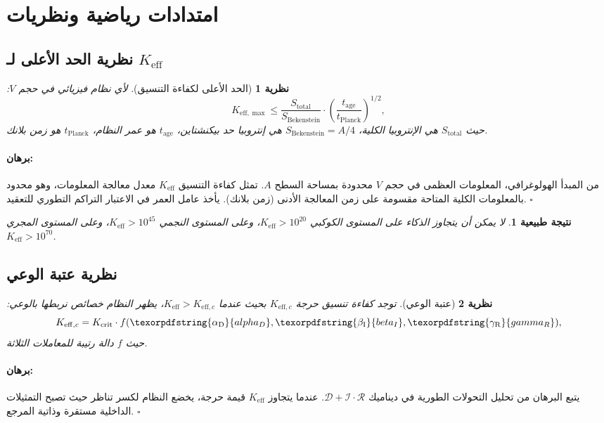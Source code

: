\documentclass[12pt,a4paper]{article}
\newtheorem{theorem}{نظرية}
\newtheorem{corollary}{نتيجة طبيعية}
\renewenvironment{proof}{\paragraph{برهان:}}{\hfill$\square$}
\DeclareRobustCommand{\alD}{\texorpdfstring{\ensuremath{\alpha_{\mathrm{D}}}}{alpha_D}}
\DeclareRobustCommand{\beI}{\texorpdfstring{\ensuremath{\beta_{\mathrm{I}}}}{beta_I}}
\DeclareRobustCommand{\gaR}{\texorpdfstring{\ensuremath{\gamma_{\mathrm{R}}}}{gamma_R}}
\newcommand{\eff}{\mathrm{eff}}
\newcommand{\Ke}{K_{\eff}}
\newcommand{\Kemax}{K_{\eff,\max}}
\newcommand{\Kec}{K_{\eff,c}}
\newcommand{\Kcrit}{K_{\mathrm{crit}}}
\begin{document}
	\section{امتدادات رياضية ونظريات}
	
	\subsection{نظرية الحد الأعلى لـ \(\Ke\)}
	
	\begin{theorem}[الحد الأعلى لكفاءة التنسيق]
		لأي نظام فيزيائي في حجم \(V\):
		\[
		\Kemax \leq \frac{S_{\mathrm{total}}}{S_{\mathrm{Bekenstein}}} \cdot \left(\frac{t_{\mathrm{age}}}{t_{\mathrm{Planck}}}\right)^{1/2},
		\]
		حيث \(S_{\mathrm{total}}\) هي الإنتروبيا الكلية، \(S_{\mathrm{Bekenstein}} = A/4\) هي إنتروبيا حد بيكنشتاين، \(t_{\mathrm{age}}\) هو عمر النظام، \(t_{\mathrm{Planck}}\) هو زمن بلانك.
	\end{theorem}
	
	\begin{proof}
		من المبدأ الهولوغرافي، المعلومات العظمى في حجم \(V\) محدودة بمساحة السطح \(A\). تمثل كفاءة التنسيق \(\Ke\) معدل معالجة المعلومات، وهو محدود بالمعلومات الكلية المتاحة مقسومة على زمن المعالجة الأدنى (زمن بلانك). يأخذ عامل العمر في الاعتبار التراكم التطوري للتعقيد.
	\end{proof}
	
	\begin{corollary}
		لا يمكن أن يتجاوز الذكاء على المستوى الكوكبي \(\Ke > 10^{20}\)، وعلى المستوى النجمي \(\Ke > 10^{45}\)، وعلى المستوى المجري \(\Ke > 10^{70}\).
	\end{corollary}
	
	\subsection{نظرية عتبة الوعي}
	
	\begin{theorem}[عتبة الوعي]
		توجد كفاءة تنسيق حرجة \(K_{\eff,c}\) بحيث عندما \(\Ke > K_{\eff,c}\)، يظهر النظام خصائص نربطها بالوعي:
		\[
		\Kec = \Kcrit \cdot f(\alD, \beI, \gaR),
		\]
		حيث \(f\) دالة رتيبة للمعاملات الثلاثة.
	\end{theorem}
	
	\begin{proof}
		يتبع البرهان من تحليل التحولات الطورية في ديناميك \(\mathcal{D}+\mathcal{I}\cdot\mathcal{R}\). عندما يتجاوز \(\Ke\) قيمة حرجة، يخضع النظام لكسر تناظر حيث تصبح التمثيلات الداخلية مستقرة وذاتية المرجع.
	\end{proof}
	
\end{document}
